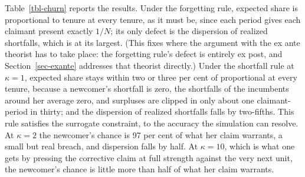 \documentclass[
  11pt,
  letterpaper,
  DIV=11,
  numbers=noendperiod,
  twoside]{scrartcl}
\begin{document}
Table~\ref{tbl-churn} reports the results. Under the forgetting rule,
expected share is proportional to tenure at every tenure, as it must be,
since each period gives each claimant present exactly \(1/N\); its only
defect is the dispersion of realized shortfalls, which is at its
largest. (This fixes where the argument with the ex ante theorist has to
take place: the forgetting rule's defect is entirely ex post, and
Section~\ref{sec-exante} addresses that theorist directly.) Under the
shortfall rule at \(\kappa = 1\), expected share stays within two or
three per cent of proportional at every tenure, because a newcomer's
shortfall is zero, the shortfalls of the incumbents around her average
zero, and surpluses are clipped in only about one claimant-period in
thirty; and the dispersion of realized shortfalls falls by two-fifths.
This rule satisfies the surrogate constraint, to the accuracy the
simulation can resolve. At \(\kappa = 2\) the newcomer's chance is 97
per cent of what her claim warrants, a small but real breach, and
dispersion falls by half. At \(\kappa = 10\), which is what one gets by
pressing the corrective claim at full strength against the very next
unit, the newcomer's chance is little more than half of what her claim
warrants.
\end{document}
